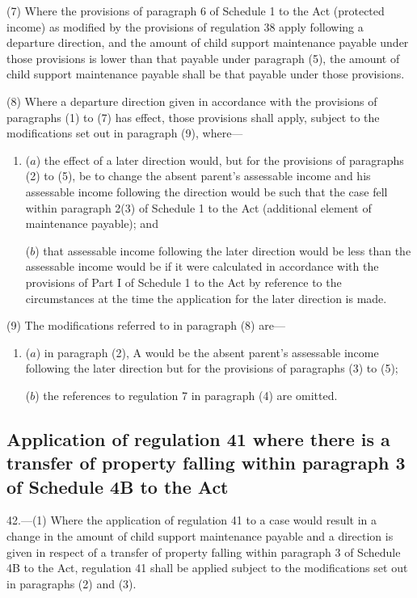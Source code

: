\documentclass[a4paper]{article}
\begin{document}
(7) Where the provisions of paragraph 6 of Schedule 1 to the Act (protected
income) as modified by the provisions of regulation 38 apply following a
departure direction, and the amount of child support maintenance payable under
those provisions is lower than that payable under paragraph (5), the amount of
child support maintenance payable shall be that payable under those provisions.

(8) Where a departure direction given in accordance with the provisions of
paragraphs (1) to (7) has effect, those provisions shall apply, subject to the
modifications set out in paragraph (9), where—
\begin{enumerate}\item[]
($a$) the effect of a later direction would, but for the provisions of paragraphs
(2) to (5), be to change the absent parent’s assessable income and his
assessable income following the direction would be such that the case fell
within paragraph 2(3) of Schedule 1 to the Act (additional element of
maintenance payable); and

($b$) that assessable income following the later direction would be less than the
assessable income would be if it were calculated in accordance with the
provisions of Part I of Schedule 1 to the Act by reference to the circumstances
at the time the application for the later direction is made.
\end{enumerate}

(9) The modifications referred to in paragraph (8) are—
\begin{enumerate}\item[]
($a$) in paragraph (2), A would be the absent parent’s assessable income following
the later direction but for the provisions of paragraphs (3) to (5);

($b$) the references to regulation 7 in paragraph (4) are omitted.
\end{enumerate}

\subsection[42. Application of regulation 41 where there is a transfer of property falling
within paragraph 3 of Schedule 4B to the Act]{Application of regulation 41 where there is a transfer of property falling
within paragraph 3 of Schedule 4B to the Act}

42.—(1) Where the application of
regulation 41 to a case would result in a change in the amount of child support
maintenance payable and a direction is given in respect of a transfer of
property falling within paragraph 3 of Schedule 4B to the Act, regulation 41
shall be applied subject to the modifications set out in paragraphs (2) and (3).
\end{document}
